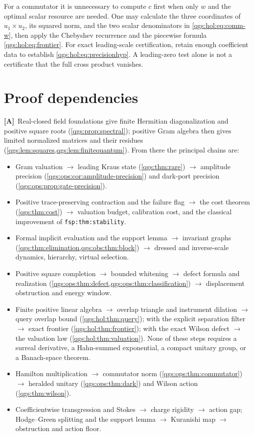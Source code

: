 \documentclass[11pt,oneside]{article}
\numberwithin{equation}{section}
\theoremstyle{plain}
\theoremstyle{definition}
\theoremstyle{remark}
\newcommand{\TA}{\textcolor{TierA}{\textsf{\bfseries[A]}}}
\begin{document}
For a commutator it is unnecessary to compute $c$ first when only $w$ and the optimal scalar resource are needed. One may calculate the three coordinates of $u_1\times u_2$, its squared norm, and the two scalar denominators in \eqref{qgs:hol:eq:comm-w}, then apply the Chebyshev recurrence and the piecewise formula \eqref{qgs:hol:eq:frontier}. For exact leading-scale certification, retain enough coefficient data to establish \eqref{qgs:hol:eq:precisionhyp}. A leading-zero test alone is not a certificate that the full cross product vanishes.

\section{Proof dependencies}\label{qgs:app:dependencies}
\TA\ Real-closed field foundations give finite Hermitian diagonalization and positive square roots (\cref{qgs:prop:spectral}); positive Gram algebra then gives limited normalized matrices and their residues (\cref{qgs:lem:squares,qgs:lem:finitequantum}). From there the principal chains are:
\begin{itemize}
\item Gram valuation $\to$ leading Kraus state (\cref{qgs:thm:rare}) $\to$ amplitude precision (\cref{qgs:ops:cor:amplitude-precision}) and dark-port precision (\cref{qgs:ops:prop:gate-precision}).
\item Positive trace-preserving contraction and the failure flag $\to$ the cost theorem (\cref{qgs:thm:cost}) $\to$ valuation budget, calibration cost, and the classical improvement of \texttt{fsp:thm:stability}.
\item Formal implicit evaluation and the support lemma $\to$ invariant graphs (\cref{qgs:thm:elimination,qgs:obs:thm:block}) $\to$ dressed and inverse-scale dynamics, hierarchy, virtual selection.
\item Positive square completion $\to$ bounded whitening $\to$ defect formula and realization (\cref{qgs:ops:thm:defect,qgs:ops:thm:classification}) $\to$ displacement obstruction and energy window.
\item Finite positive linear algebra $\to$ overlap triangle and instrument dilation $\to$ query overlap bound (\cref{qgs:hol:thm:query}); with the explicit separation filter $\to$ exact frontier (\cref{qgs:hol:thm:frontier}); with the exact Wilson defect $\to$ the valuation law (\cref{qgs:hol:thm:valuation}). None of these steps requires a surreal derivative, a Hahn-summed exponential, a compact unitary group, or a Banach-space theorem.
\item Hamilton multiplication $\to$ commutator norm (\cref{qgs:ops:thm:commutator}) $\to$ heralded unitary (\cref{qgs:ops:thm:dark}) and Wilson action (\cref{qgs:thm:wilson}).
\item Coefficientwise transgression and Stokes $\to$ charge rigidity $\to$ action gap; Hodge--Green splitting and the support lemma $\to$ Kuranishi map $\to$ obstruction and action floor.
\end{itemize}
\end{document}
